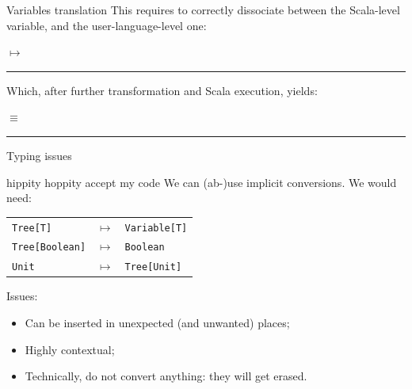 \documentclass{beamer}
\newcommand{\translation}[2][0.5]{%
    \begin{minipage}[t]{#1\textwidth - 0.05\textwidth}%
    \end{minipage}%
    \hfill{}$\longmapsto$\hfill{}%
    \begin{minipage}[t]{0.95\textwidth - #1\textwidth}%
    \end{minipage}
    \rule{\textwidth}{0.4pt}
}
\newcommand{\equivalent}[1]{%
    $\equiv$\hfill{}%
    \begin{minipage}[t]{0.95\textwidth}%
    \end{minipage}
    \rule{\textwidth}{0.4pt}
}
\begin{document}
    \begin{frame}{Variables translation}
        This requires to correctly dissociate between the Scala-level variable, and the user-language-level one:

        \translation{code/variable}

        \pause
        Which, after further transformation and Scala execution, yields:
        
        \equivalent{code/variable}
    \end{frame}

    \begin{frame}{Typing issues}
    \end{frame}

    \begin{frame}{hippity hoppity accept my code}
        We can (ab-)use implicit conversions. We would need:
        \begin{center}
            \begin{tabular}{lll}
                \lstinline{Tree[T]} & $\longmapsto$ & \lstinline{Variable[T]} \\ %
                \lstinline{Tree[Boolean]} & $\longmapsto$ & \lstinline{Boolean} \\ %
                \lstinline{Unit} & $\longmapsto$ & \lstinline{Tree[Unit]} %
            \end{tabular}
        \end{center}

        \pause
        Issues:
        \begin{itemize}
            \item Can be inserted in unexpected (and unwanted) places;
            \item Highly contextual;
            \item Technically, do not convert anything: they will get erased.
        \end{itemize}
    \end{frame}
\end{document}
